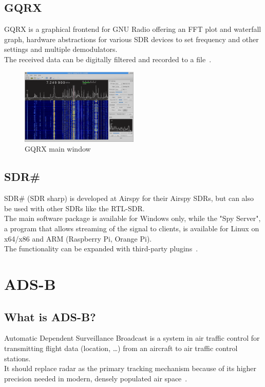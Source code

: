 \documentclass[conference]{IEEEtran}
\begin{document}
\subsection{GQRX}
GQRX is a graphical frontend for GNU Radio offering an FFT plot and waterfall graph, hardware abstractions for various SDR devices to set frequency and other settings and multiple demodulators.\\
The received data can be digitally filtered and recorded to a file~\cite{GQRX19Home}.
\begin{figure}[H]
	\centering
	\includegraphics[width=0.5\textwidth]{gqrx_main_window}
	\caption{GQRX main window~\cite{GQRX19Home}}
\end{figure}

\subsection{SDR\#}
SDR\# (SDR sharp) is developed at Airspy for their Airspy SDRs, but can also be used with other SDRs like the RTL-SDR.\\The main software package is available for Windows only, while the "Spy Server", a program that allows streaming of the signal to clients, is available for Linux on x64/x86 and ARM (Raspberry Pi, Orange Pi).\\
The functionality can be expanded with third-party plugins~\cite{SDRsharp19Download}.

\section{ADS-B}
\subsection{What is ADS-B?}
Automatic Dependent Surveillance Broadcast is a system in air traffic control for transmitting flight data (location, \ldots) from an aircraft to air traffic control stations.\\
It should replace radar as the primary tracking mechanism because of its higher precision needed in modern, densely populated air space~\cite{strohmeier2014realities}.
\end{document}

